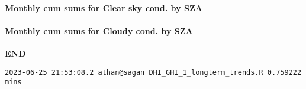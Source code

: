 \documentclass[
  10pt,
  a4paper,oneside]{article}
\begin{document}
\hypertarget{monthly-cum-sums-for-clear-sky-cond.-by-sza-1}{%
\paragraph{Monthly cum sums for Clear sky cond. by SZA}\label{monthly-cum-sums-for-clear-sky-cond.-by-sza-1}}

\newpage

\FloatBarrier

\hypertarget{monthly-cum-sums-for-cloudy-cond.-by-sza-1}{%
\paragraph{Monthly cum sums for Cloudy cond. by SZA}\label{monthly-cum-sums-for-cloudy-cond.-by-sza-1}}

\textbf{END}

\begin{verbatim}
2023-06-25 21:53:08.2 athan@sagan DHI_GHI_1_longterm_trends.R 0.759222 mins
\end{verbatim}
\end{document}

